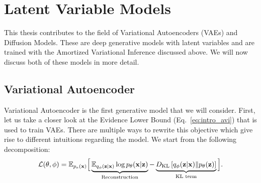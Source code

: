 \section{Latent Variable Models}\label{sec:into_latent_variable_models}
This thesis contributes to the field of Variational Autoencoders (VAEs) and Diffusion Models. These are deep generative models with latent variables and are trained with the Amortized Variational Inference discussed above. We will now discuss both of these models in more detail.

\subsection{Variational Autoencoder}
Variational Autoencoder is the first generative model that we will consider. 
First, let us take a closer look at the Evidence Lower Bound (Eq.~\ref{eq:intro_avi}) that is used to train VAEs. There are multiple ways to rewrite this objective which give rise to different intuitions regarding the model. We start from the following decomposition:
\begin{equation}\label{eq:intro_elbo_again}
\mathcal{L}(\theta, \phi) = \E_{p_e(\rvx)}\Big[ \underbrace{\E_{q_{\phi}(\rvz|\rvx)} \log p_{\theta}(\rvx| \rvz)}_{\text{Reconstruction}} - \underbrace{\KL{q_{\phi}(\rvz|\rvx)}{p_{\theta}(\rvz)}}_{\text{KL term}} \Big].
\end{equation}
